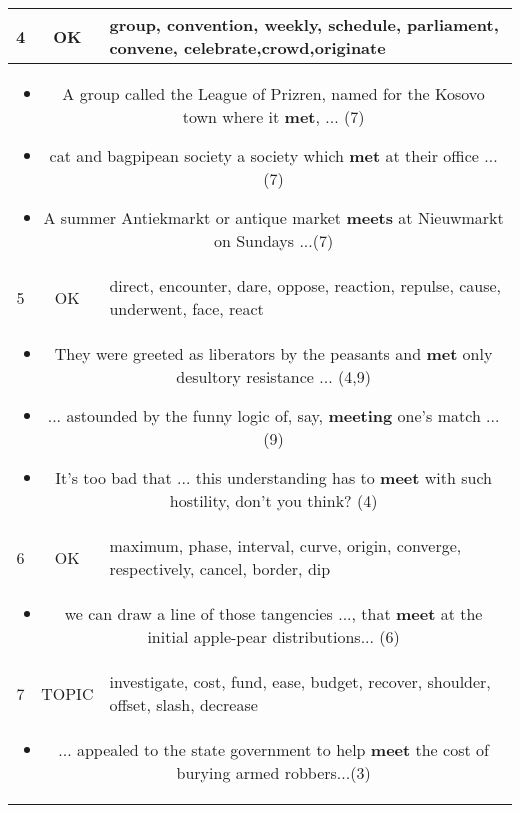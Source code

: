 \documentclass[11pt,a4paper]{article}
\begin{document}
\begin{table*}[htp!]
\begin{tabularx}{\linewidth}{| c |  c| X | }
    4  & OK & group, convention, weekly, schedule, parliament, convene, celebrate,crowd,originate \\ \hline
    \multicolumn{3}{|p{0.92\linewidth}|}{
    \begin{itemize}[topsep=0pt,itemsep=0pt, parsep=0pt]
        \item A group called the League of Prizren, named for the Kosovo town where it {\bf met}, ... (7)
        \item cat and bagpipean society a society which {\bf met} at their office ... (7)
      \item A summer Antiekmarkt or antique market {\bf meets} at Nieuwmarkt on Sundays ...(7)
    \end{itemize}
  }\\
  \hline\hline
    5 & OK & direct, encounter, dare, oppose, reaction, repulse, cause, underwent, face, react \\ \hline
    \multicolumn{3}{|p{0.92\linewidth}|}{
    \begin{itemize}[topsep=0pt,itemsep=0pt, parsep=0pt]
        \item They were greeted as liberators by the peasants and {\bf met} only desultory resistance ... (4,9)
        \item ... astounded by the funny logic of, say, {\bf meeting} one's match ... (9)
      \item It's too bad that ... this understanding has to {\bf meet} with such hostility, don't you think? (4)
    \end{itemize}
  }\\
  \hline\hline
    6 & OK & maximum, phase, interval, curve, origin, converge, respectively, cancel, border, dip \\ \hline
    \multicolumn{3}{|p{0.95\linewidth}|}{
    \begin{itemize}[topsep=0pt,itemsep=0pt, parsep=0pt]
        \item we can draw a line of those tangencies ..., that  {\bf meet} at the initial apple-pear distributions... (6)
    \end{itemize}
  }\\
  \hline\hline
  7& TOPIC & investigate, cost, fund, ease, budget, recover, shoulder, offset, slash, decrease \\ \hline
    \multicolumn{3}{|p{0.92\linewidth}|}{
    \begin{itemize}[topsep=0pt,itemsep=0pt, parsep=0pt]
        \item  ... appealed to the state government to help {\bf meet} the cost of burying armed robbers...(3)

\end{itemize}}
\end{tabularx}
\end{table*}
\end{document}
